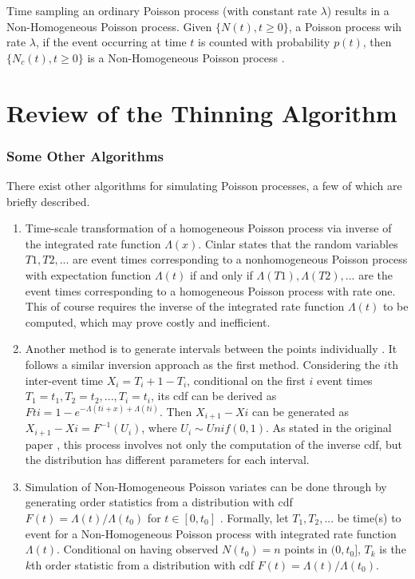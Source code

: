 \documentclass[%
 reprint,
 amsmath,amssymb,
 aps,
]{revtex4-2}
\theoremstyle{definition}
\begin{document}
Time sampling an ordinary Poisson process (with constant rate $\lambda$) results in a Non-Homogeneous Poisson process. Given $\{N(t), t \ge 0\}$, a Poisson process wih rate $\lambda$, if the event occurring at time $t$ is counted with probability $p(t)$, then $\{N_c(t) , t\ge 0\}$ is a Non-Homogeneous Poisson process \cite{Ross_2006}.

\section{\label{q:2}Review of the Thinning Algorithm}


\subsubsection{Some Other Algorithms}
There exist other algorithms for simulating Poisson processes, a few of which are briefly described.
\begin{enumerate}
\item Time-scale transformation of a homogeneous Poisson process via inverse of the integrated rate function $\Lambda(x)$. Cinlar \cite{cinlar1975introduction} states that the random variables $T1, T2, . . .$ are event times corresponding to a nonhomogeneous Poisson process with expectation function $\Lambda(t)$ if and only if $\Lambda(T1),\Lambda(T2), . . .$ are the event times corresponding to a homogeneous Poisson process with rate one. This of course requires the inverse of the integrated rate function $\Lambda(t)$ to be computed, which may prove costly and inefficient.

\item Another method is to generate intervals between the points individually \cite{pasupathy}. It follows a similar inversion approach as the first method. Considering the $i$th inter-event time $X_i = T_i+1 - T_i$, conditional on the first $i$ event times $T_1 = t_1, T_2 = t_2, . . . , T_i = t_i$, its cdf can be derived as $Fti = 1 - e^{-\Lambda(ti + x) + \Lambda(ti)}$. Then $X_{i+1} - X{i}$ can be generated as $X_{i+1} - X{i} = F^{-1}(U_i)$, where $U_i \sim Unif(0,1)$. As stated in the original paper \cite{lewis_shedler_1979}, this process involves not only the computation of the inverse cdf, but the distribution has different parameters for each interval.

\item Simulation of Non-Homogeneous Poisson variates can be done through by generating order statistics from a distribution with cdf $F(t) = \Lambda(t)/\Lambda(t_0)$ for $t\in [0,t_0]$ \cite{lewis_shedler_1976}. Formally, let $T_1 , T_2 , ...$ be time(s) to event for a Non-Homogeneous Poisson process with integrated rate function $\Lambda(t)$. Conditional on having observed $N(t_0) = n$ points in $(0,t_0]$, $T_k$ is the $k$th order statistic from a distribution with cdf $F(t) = \Lambda(t) / \Lambda(t_0)$.
\end{enumerate}
\end{document}
